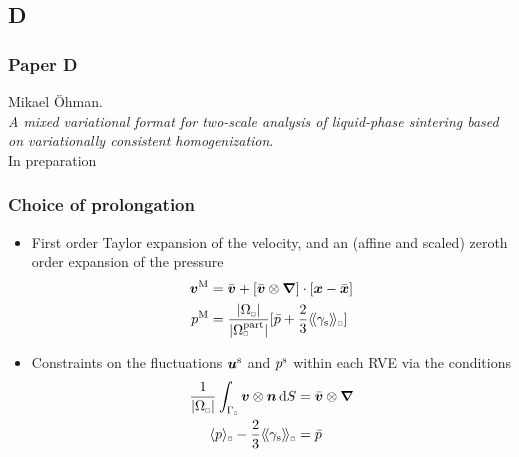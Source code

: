 \documentclass[11pt]{beamer} %
\DeclarePairedDelimiter{\homgen}{\langle}{\rangle_\rve}
\DeclarePairedDelimiter{\shomgen}{\langle\!\langle}{\rangle\!\rangle_\rve}
\newcommand{\volume}{|\Omega_\rve|}
\newcommand{\surf}{\mathrm{s}}
\newcommand{\particle}{\mathrm{part}}
\newcommand{\rve}{
  {\mathchoice
   {\mbox{\scalebox{0.67}{$\Box$}}}
   {\mbox{\scalebox{0.67}{$\Box$}}}
   {\mbox{\scalebox{0.5}{$\Box$}}}
   {\mbox{\scalebox{0.375}{$\Box$}}}
  }
}
\begin{document}
\subsection{D}
\begin{frame}
 \frametitle{Paper D}
\begin{center}
Mikael Öhman.
\\[1em]
\textit{A mixed variational format for two-scale analysis of liquid-phase sintering based on variationally consistent homogenization}.
\\[1em]
In preparation
\end{center}
\end{frame}

\begin{frame}
 \frametitle{Choice of prolongation}
\begin{itemize}
 \item First order Taylor expansion of the velocity, and an (affine and scaled) zeroth order expansion of the pressure 
\begin{align*}
 \ta v^\macro &= \bar{\ta v} + [\bar{\ta v}\outerp\diff]\cdot[\ta x - \bar{\ta x}]
\\
 p^\macro &= \frac{\volume}{|\Omega_\rve^\particle|}[\bar{p} + \frac23\shomgen{\gamma_\surf}]
\end{align*}
\item Constraints on the fluctuations $\boldsymbol{u}^{\mathrm{s}}$ and $p^{\mathrm{s}}$ within each RVE via the conditions
\begin{align*}
 \frac{1}{\volume}\int_{\Gamma_\rve}\ta v\outerp\ta n\dif S &= \bar{\ta v}\outerp\diff
\\
 \homgen{p} - \frac23\shomgen{\gamma_\surf} &= \bar{p}
\end{align*}
\end{itemize}
\end{frame}
\end{document}
